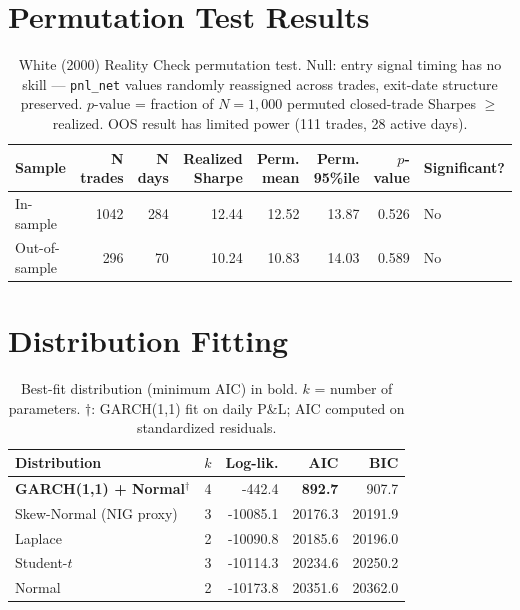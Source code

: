 \documentclass[12pt,a4paper]{article}
\begin{document}
\section{Permutation Test Results}
\begin{table}[htbp]
\centering
\small
\caption{White (2000) Reality Check permutation test. Null: entry signal timing has no skill --- \texttt{pnl\_net} values randomly reassigned across trades, exit-date structure preserved. $p$-value = fraction of $N=1{,}000$ permuted closed-trade Sharpes $\geq$ realized. OOS result has limited power (111 trades, 28 active days).}
\label{tab:permutation}
\begin{tabular}{lrrrrrrl}
\toprule
Sample & N trades & N days & Realized Sharpe & Perm. mean & Perm. 95\%ile & $p$-value & Significant? \\
\midrule
In-sample & 1042 & 284 & 12.44 & 12.52 & 13.87 & 0.526 & No \\
Out-of-sample & 296 & 70 & 10.24 & 10.83 & 14.03 & 0.589 & No \\
\bottomrule
\end{tabular}
\end{table}

\section{Distribution Fitting}
\begin{table}[htbp]
\centering
\small
\caption{Best-fit distribution (minimum AIC) in bold. $k$ = number of parameters. $\dagger$: GARCH(1,1) fit on daily P\&L; AIC computed on standardized residuals.}
\label{tab:dist_fit}
\begin{tabular}{lrrrr}
\toprule
Distribution & $k$ & Log-lik. & AIC & BIC \\
\midrule
\textbf{GARCH(1,1) + Normal$^{\dagger}$} & 4 & -442.4 & \textbf{892.7} & 907.7 \\
Skew-Normal (NIG proxy) & 3 & -10085.1 & 20176.3 & 20191.9 \\
Laplace & 2 & -10090.8 & 20185.6 & 20196.0 \\
Student-$t$ & 3 & -10114.3 & 20234.6 & 20250.2 \\
Normal & 2 & -10173.8 & 20351.6 & 20362.0 \\
\bottomrule
\end{tabular}
\end{table}
\end{document}
